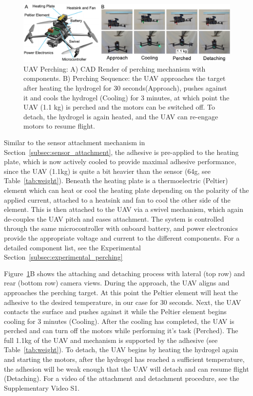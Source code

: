 \begin{figure}
  \includegraphics[width=\linewidth]{chapters/papers/SB/figures/fig-5-perching-placeholder/fig-5-perching-placeholder.pdf}
  \caption{UAV Perching: A) CAD Render of perching mechanism with components. B) Perching Sequence: the UAV approaches the target after heating the hydrogel for 30 seconds(Approach), pushes against it and cools the hydrogel (Cooling) for 3 minutes, at which point the UAV (1.1 kg) is perched and the motors can be switched off. To detach, the hydrogel is again heated, and the UAV can re-engage motors to resume flight.}
  \label{fig:fig5-placeholder}
\end{figure}
Similar to the sensor attachment mechanism in Section~\ref{subsec:sensor_attachment}, the adhesive is pre-applied to the heating plate, which is now actively cooled to provide maximal adhesive performance, since the UAV (1.1kg) is quite a bit heavier than the sensor (64g, see Table~\ref{tab:weight}). Beneath the heating plate is a thermoelectric (Peltier) element which can heat or cool the heating plate depending on the polarity of the applied current, attached to a heatsink and fan to cool the other side of the element. This is then attached to the UAV via a swivel mechanism, which again de-couples the UAV pitch and eases attachment. The system is controlled through the same microcontroller with onboard battery, and power electronics provide the appropriate voltage and current to the different components. For a detailed component list, see the Experimental Section~\ref{subsec:experimental_perching}

Figure~\ref{fig:fig5-placeholder}B shows the attaching and detaching process with lateral (top row) and rear (bottom row) camera views. During the approach, the UAV aligns and approaches the perching target. At this point the Peltier element will heat the adhesive to the desired temperature, in our case for 30 seconds. Next, the UAV contacts the surface and pushes against it while the Peltier element begins cooling for 3 minutes (Cooling). After the cooling has completed, the UAV is perched and can turn off the motors while performing it's task (Perched). The full 1.1kg of the UAV and mechanism is supported by the adhesive (see Table~\ref{tab:weight}). To detach, the UAV begins by heating the hydrogel again and starting the motors, after the hydrogel has reached a sufficient temperature, the adhesion will be weak enough that the UAV will detach and can resume flight (Detaching). For a video of the attachment and detachment procedure, see the Supplementary Video S1.


